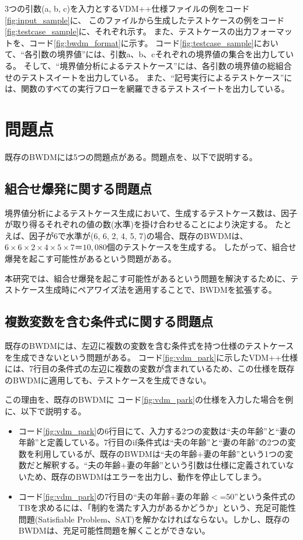 \documentclass[uplatex, report, a4j, 10pt]{jsbook}
\begin{document}
3つの引数(a, b, c)を入力とするVDM++仕様ファイルの例をコード\ref{fig:input_sample}に、
このファイルから生成したテストケースの例をコード\ref{fig:testcase_sample}に、それぞれ示す。
また、テストケースの出力フォーマットを、コード\ref{fig:bwdm_format}に示す。
コード\ref{fig:testcase_sample}において、“各引数の境界値”には、引数a、b、cそれぞれの境界値の集合を出力している。
そして、“境界値分析によるテストケース”には、各引数の境界値の総組合せのテストスイートを出力している。
また、“記号実行によるテストケース”には、関数のすべての実行フローを網羅できるテストスイートを出力している。

\section{問題点}\label{sec:bwdm_problem}
既存のBWDMには5つの問題点がある。問題点を、以下で説明する。

\subsection{組合せ爆発に関する問題点}\label{sec:problem_pairwise}
境界値分析によるテストケース生成において、生成するテストケース数は、因子が取り得るそれぞれの値の数(水準)を掛け合わせることにより決定する。
たとえば、因子が6で水準が(6, 6, 2, 4, 5, 7)の場合、既存のBWDMは、$6 \times 6 \times 2 \times 4 \times 5 \times 7＝10,080個$のテストケースを生成する。
したがって、組合せ爆発を起こす可能性があるという問題がある。

本研究では、組合せ爆発を起こす可能性があるという問題を解決するために、テストケース生成時にペアワイズ法を適用することで、BWDMを拡張する。

\subsection{複数変数を含む条件式に関する問題点}\label{sec:problem_double_var}

既存のBWDMには、左辺に複数の変数を含む条件式を持つ仕様のテストケースを生成できないという問題がある。
コード\ref{fig:vdm_park}に示したVDM++仕様には、7行目の条件式の左辺に複数の変数が含まれているため、この仕様を既存のBWDMに適用しても、テストケースを生成できない。

この理由を、既存のBWDMに コード\ref{fig:vdm_park}の仕様を入力した場合を例に、以下で説明する。

\begin{itemize}
  \item  コード\ref{fig:vdm_park}の6行目にて、入力する2つの変数は“夫の年齢”と“妻の年齢”と定義している。7行目のif条件式は“夫の年齢”と“妻の年齢”の2つの変数を利用しているが、既存のBWDMは“夫の年齢+妻の年齢”という1つの変数だと解釈する。“夫の年齢+妻の年齢”という引数は仕様に定義されていないため、既存のBWDMはエラーを出力し、動作を停止してしまう。
  \item  コード\ref{fig:vdm_park}の7行目の“夫の年齢+妻の年齢$<$=50”という条件式のTBを求めるには、「制約を満たす入力があるかどうか」という、充足可能性問題(Satisfiable Problem、SAT)\cite{sat}を解かなければならない。しかし、既存のBWDMは、充足可能性問題を解くことができない。
\end{itemize}
\end{document}
